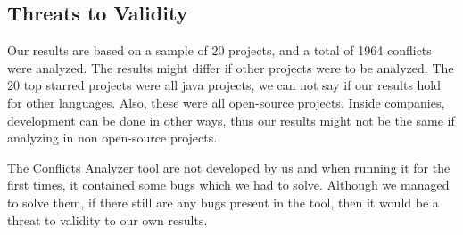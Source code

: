 \subsection{Threats to Validity}
Our results are based on a sample of 20 projects, and a total of 1964 conflicts were analyzed. The results might differ if other projects were to be analyzed. The 20 top starred projects were all java projects, we can not say if our results hold for other languages. Also, these were all open-source projects. Inside companies, development can be done in other ways, thus our results might not be the same if analyzing in non open-source projects.

The Conflicts Analyzer tool are not developed by us and when running it for the first times, it contained some bugs which we had to solve. Although we managed to solve them, if there still are any bugs present in the tool, then it would be a threat to validity to our own results.


